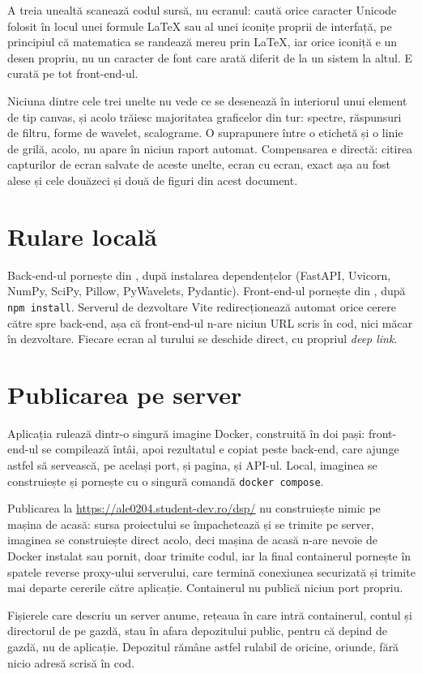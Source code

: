 A treia unealtă scanează codul sursă, nu ecranul: caută orice caracter
Unicode folosit în locul unei formule LaTeX sau al unei iconițe proprii de
interfață, pe principiul că matematica se randează mereu prin LaTeX, iar
orice iconiță e un desen propriu, nu un caracter de font care arată diferit
de la un sistem la altul. E curată pe tot front-end-ul.

Niciuna dintre cele trei unelte nu vede ce se desenează în interiorul unui
element de tip canvas, și acolo trăiesc majoritatea graficelor din tur:
spectre, răspunsuri de filtru, forme de wavelet, scalograme. O suprapunere
între o etichetă și o linie de grilă, acolo, nu apare în niciun raport
automat. Compensarea e directă: citirea capturilor de ecran salvate de
aceste unelte, ecran cu ecran, exact așa au fost alese și cele douăzeci și
două de figuri din acest document.

\section{Rulare locală}

Back-end-ul pornește din , după instalarea dependențelor
(FastAPI, Uvicorn, NumPy, SciPy, Pillow, PyWavelets, Pydantic). Front-end-ul
pornește din , după \texttt{npm install}. Serverul de dezvoltare
Vite redirecționează automat orice cerere către  spre back-end,
așa că front-end-ul n-are niciun URL scris în cod, nici măcar în dezvoltare.
Fiecare ecran al turului se deschide direct, cu propriul \emph{deep link}.

\section{Publicarea pe server}

Aplicația rulează dintr-o singură imagine Docker, construită în doi pași:
front-end-ul se compilează întâi, apoi rezultatul e copiat peste back-end,
care ajunge astfel să servească, pe același port, și pagina, și API-ul.
Local, imaginea se construiește și pornește cu o singură comandă
\texttt{docker compose}.

Publicarea la \url{https://ale0204.student-dev.ro/dsp/} nu construiește nimic
pe mașina de acasă: sursa proiectului se împachetează și se trimite pe
server, imaginea se construiește direct acolo, deci mașina de acasă n-are
nevoie de Docker instalat sau pornit, doar trimite codul, iar la final
containerul pornește în spatele reverse proxy-ului serverului, care termină
conexiunea securizată și trimite mai departe cererile către aplicație.
Containerul nu publică niciun port propriu.

Fișierele care descriu un server anume, rețeaua în care intră containerul,
contul și directorul de pe gazdă, stau în afara depozitului public, pentru
că depind de gazdă, nu de aplicație. Depozitul rămâne astfel rulabil de
oricine, oriunde, fără nicio adresă scrisă în cod.
